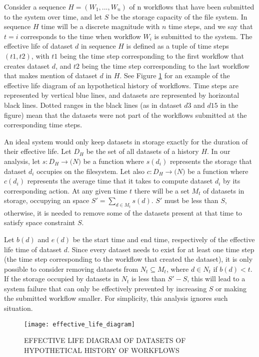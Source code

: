 Consider a sequence $H=(W_1, ..., W_n)$ of n workflows that have been submitted to the system over time, and let $S$ be the storage capacity of the file system.  In sequence $H$ time will be a discrete magnitude with $n$ time steps, and we say that $t = i$ corresponds to the time when workflow $W_i$ is submitted to the system. The effective life of dataset $d$ in sequence $H$ is defined as a tuple of time steps $(t1, t2)$, with $t1$ being the time step corresponding to the first workflow that creates dataset $d$, and  $t2$ being the time step corresponding to the last workflow that makes mention of dataset $d$ in $H$.  See Figure \ref{fig:effective_life} for an example of the effective life diagram of an hypothetical history of workflows.  Time steps are represented by vertical blue lines, and datasets are represented by horizontal black lines.  Dotted ranges in the black lines (as in dataset $d3$ and $d15$ in the figure) mean that the datasets were not part of the workflows submitted at the corresponding time steps.

An ideal system would only keep datasets in storage exactly for the duration of their effective life.  Let $D_H$ be the set of all datasets of a history $H$.  In our analysis, let $s: D_H \to \mathtt(N)$ be a function where $s(d_i)$ represents the storage that dataset $d_i$ occupies on the filesystem.  Let also $c: D_H \to \mathtt(N)$ be a function where $c(d_i)$ represents the average time that it takes to compute dataset $d_i$ by its corresponding action. At any given time $t$ there will be a set $M_t$ of datasets in storage, occupying an space $S' = \sum_{d \in M_t}{s(d)}$.  $S'$ must be less than $S$, otherwise, it is needed to remove some of the datasets present at that time to satisfy space constraint $S$.

Let $b(d)$ and $e(d)$ be the start time and end time, respectively of the effective life time of dataset $d$.  Since every dataset needs to exist for at least one time step (the time step corresponding to the workflow that created the dataset), it is only possible to consider removing datasets from $N_t \subseteq M_t$, where $d \in N_t$ if $b(d) < t$.  If the storage occupied by datasets in $N_t$ is less than $S' - S$, this will lead to a system failure that can only be effectively prevented by increasing $S$ or making the submitted workflow smaller.  For simplicity, this analysis ignores such situation.

\begin{figure}
\centering
\texttt{[image: effective\_life\_diagram]}
\caption{EFFECTIVE LIFE DIAGRAM OF DATASETS OF HYPOTHETICAL HISTORY OF WORKFLOWS}
\label{fig:effective_life}
\end{figure}

